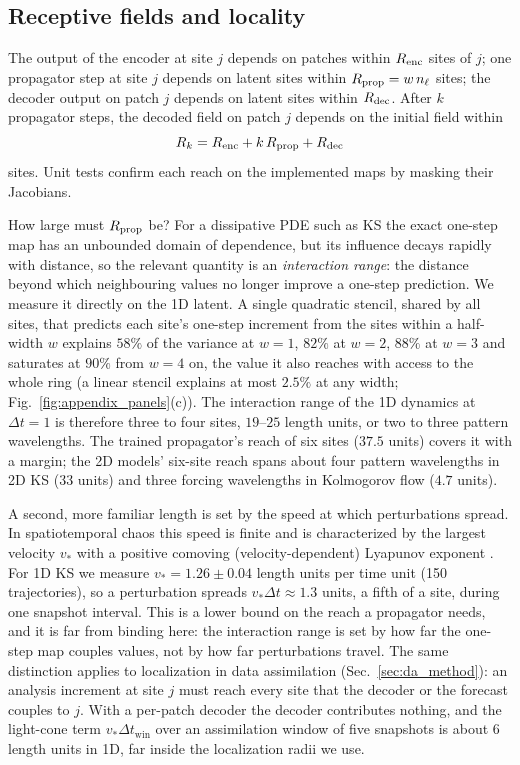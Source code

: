 \subsection{Receptive fields and locality}
\label{sec:receptive}

The output of the encoder at site $j$ depends on patches within
$R_{\mathrm{enc}}$ sites of $j$; one propagator step at site $j$ depends on latent
sites within $R_{\mathrm{prop}} = w\,n_\ell$ sites; the decoder output on patch $j$
depends on latent sites within $R_{\mathrm{dec}}$. After $k$ propagator steps,
the decoded field on patch $j$ depends on the initial field within
\begin{equation}
  R_k = R_{\mathrm{enc}} + k\,R_{\mathrm{prop}} + R_{\mathrm{dec}}
  \label{eq:light_cone}
\end{equation}
sites. Unit tests confirm each reach on the implemented maps by masking
their Jacobians.

How large must $R_{\mathrm{prop}}$ be? For a dissipative PDE such as KS the exact
one-step map has an unbounded domain of dependence, but its influence
decays rapidly with distance, so the relevant quantity is an
\emph{interaction range}: the distance beyond which neighbouring values
no longer improve a one-step prediction. We measure it directly on the
1D latent. A single quadratic stencil, shared by all sites, that predicts
each site's one-step increment from the sites within a half-width $w$
explains $58\%$ of the variance at $w=1$, $82\%$ at $w=2$, $88\%$ at
$w=3$ and saturates at $90\%$ from $w=4$ on, the value it also reaches
with access to the whole ring (a linear stencil explains at most
$2.5\%$ at any width; Fig.~\ref{fig:appendix_panels}(c)). The interaction range of the 1D dynamics at
$\Delta t=1$ is therefore three to four sites, $19$--$25$ length units, or
two to three pattern wavelengths. The trained propagator's reach of six
sites ($37.5$ units) covers it with a margin; the 2D models' six-site
reach spans about four pattern wavelengths in 2D KS ($33$ units) and
three forcing wavelengths in Kolmogorov flow ($4.7$ units).

A second, more familiar length is set by the speed at which
perturbations spread. In spatiotemporal chaos this speed is finite and
is characterized by the largest velocity $v_*$ with a positive comoving
(velocity-dependent) Lyapunov exponent
\citep{kaneko1986,deisslerkaneko1987}. For 1D KS we measure
$v_*=1.26\pm0.04$ length units per time unit (150 trajectories), so a
perturbation spreads $v_*\Delta t\approx1.3$ units, a fifth of a site,
during one snapshot interval. This is a lower bound on the reach a
propagator needs, and it is far from binding here: the interaction range
is set by how far the one-step map couples values, not by how far
perturbations travel. The same distinction applies to localization in
data assimilation (Sec.~\ref{sec:da_method}): an analysis increment at
site $j$ must reach every site that the decoder or the forecast couples to
$j$. With a per-patch decoder the decoder contributes nothing, and the
light-cone term $v_*\Delta t_{\mathrm{win}}$ over an assimilation window
of five snapshots is about $6$ length units in 1D, far inside the
localization radii we use.

